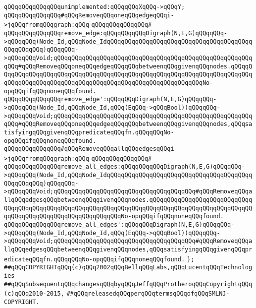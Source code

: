 \newline
\verb|qQQqqQQqqQQqqQQqunimplemented:qQQqqQQqXqQQq->qQQqY;|\newline
\newline
\verb|qQQqqQQqqQQqqQQq#qQQqRemoveqQQqoneqQQqedgeqQQqi->jqQQqfromqQQqgraph:qQQq|\newline
\verb|qQQqqQQqqQQqqQQq#|\newline
\verb|qQQqqQQqqQQqqQQqremove_edge:qQQqqQQqqQQqDigraph(N,E,G)qQQqqQQq->qQQqqQQq(Node_Id,qQQqNode_IdqQQqqQQqqQQqqQQqqQQqqQQqqQQqqQQqqQQqqQQqqQQqqQQqqQQq)qQQqqQQq->qQQqqQQqVoid;qQQqqQQqqQQqqQQqqQQqqQQqqQQqqQQqqQQqqQQqqQQqqQQqqQQqqQQqqQQq#qQQqRemoveqQQqoneqQQqedgeqQQqqQQqbetweenqQQqgivenqQQqnodes.qQQqqQQqqQQqqQQqqQQqqQQqqQQqqQQqqQQqqQQqqQQqqQQqqQQqqQQqqQQqqQQqqQQqqQQqqQQqqQQqqQQqqQQqqQQqqQQqqQQqqQQqqQQqqQQqqQQqqQQqqQQqqQQqqQQqNo-opqQQqifqQQqnoneqQQqfound.|\newline
\verb|qQQqqQQqqQQqqQQqremove_edge':qQQqqQQqDigraph(N,E,G)qQQqqQQq->qQQqqQQq(Node_Id,qQQqNode_Id,qQQq(EqQQq->qQQqBool))qQQqqQQq->qQQqqQQqVoid;qQQqqQQqqQQqqQQqqQQqqQQqqQQqqQQqqQQqqQQqqQQqqQQqqQQqqQQqqQQq#qQQqRemoveqQQqoneqQQqedgeqQQqqQQqbetweenqQQqgivenqQQqnodes,qQQqsatisfyingqQQqgivenqQQqpredicateqQQqfn.qQQqqQQqNo-opqQQqifqQQqnoneqQQqfound.|\newline
\newline
\verb|qQQqqQQqqQQqqQQq#qQQqRemoveqQQqallqQQqedgesqQQqi->jqQQqfromqQQqgraph:qQQq|\newline
\verb|qQQqqQQqqQQqqQQq#|\newline
\verb|qQQqqQQqqQQqqQQqremove_all_edges:qQQqqQQqqQQqDigraph(N,E,G)qQQqqQQq->qQQqqQQq(Node_Id,qQQqNode_IdqQQqqQQqqQQqqQQqqQQqqQQqqQQqqQQqqQQqqQQqqQQqqQQqqQQq)qQQqqQQq->qQQqqQQqVoid;qQQqqQQqqQQqqQQqqQQqqQQqqQQqqQQqqQQqqQQq#qQQqRemoveqQQqallqQQqedgesqQQqbetweenqQQqgivenqQQqnodes.qQQqqQQqqQQqqQQqqQQqqQQqqQQqqQQqqQQqqQQqqQQqqQQqqQQqqQQqqQQqqQQqqQQqqQQqqQQqqQQqqQQqqQQqqQQqqQQqqQQqqQQqqQQqqQQqqQQqqQQqqQQqqQQqqQQqNo-opqQQqifqQQqnoneqQQqfound.|\newline
\verb|qQQqqQQqqQQqqQQqremove_all_edges':qQQqqQQqDigraph(N,E,G)qQQqqQQq->qQQqqQQq(Node_Id,qQQqNode_Id,qQQq(EqQQq->qQQqBool))qQQqqQQq->qQQqqQQqVoid;qQQqqQQqqQQqqQQqqQQqqQQqqQQqqQQqqQQqqQQq#qQQqRemoveqQQqallqQQqedgesqQQqbetweenqQQqgivenqQQqnodes,qQQqsatisfyingqQQqgivenqQQqpredicateqQQqfn.qQQqqQQqNo-opqQQqifqQQqnoneqQQqfound.|\newline
\verb|};|\newline
\newline
\newline
\newline
\verb|##qQQqCOPYRIGHTqQQq(c)qQQq2002qQQqBellqQQqLabs,qQQqLucentqQQqTechnologies|\newline
\verb|##qQQqSubsequentqQQqchangesqQQqbyqQQqJeffqQQqProtheroqQQqCopyrightqQQq(c)qQQq2010-2015,|\newline
\verb|##qQQqreleasedqQQqperqQQqtermsqQQqofqQQqSMLNJ-COPYRIGHT.|\newline

